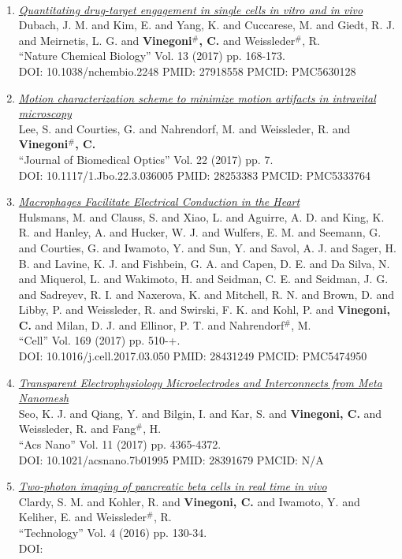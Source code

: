 \documentclass{resume}
\begin{document}
\begin{category}{~~}
\begin{enumerate}
\item \href{https://cvinegoni.github.io/assets/pdf/papers/2017-NCBIOL.pdf}{\it  Quantitating drug-target engagement in single cells in vitro and in vivo} \\ Dubach, J. M. and Kim, E. and Yang, K. and Cuccarese, M. and Giedt, R. J. and Meirnetis, L. G. and {\bf Vinegoni$^\#$, C.} and Weissleder$^\#$, R. \\ ``Nature Chemical Biology'' Vol. 13 (2017) pp. 168-173. \\ DOI: 10.1038/nchembio.2248 PMID: 27918558 PMCID: PMC5630128




\item \href{https://cvinegoni.github.io/assets/pdf/papers/2017-JBO.pdf}{\it  Motion characterization scheme to minimize motion artifacts in intravital microscopy} \\ Lee, S. and Courties, G. and Nahrendorf, M. and Weissleder, R. and {\bf Vinegoni$^\#$, C.} \\ ``Journal of Biomedical Optics'' Vol. 22 (2017) pp. 7. \\ DOI: 10.1117/1.Jbo.22.3.036005 PMID: 28253383 PMCID: PMC5333764\item \href{https://cvinegoni.github.io/assets/pdf/papers/2017-CELL.pdf}{\it  Macrophages Facilitate Electrical Conduction in the Heart} \\ Hulsmans, M. and Clauss, S. and Xiao, L. and Aguirre, A. D. and King, K. R. and Hanley, A. and Hucker, W. J. and Wulfers, E. M. and Seemann, G. and Courties, G. and Iwamoto, Y. and Sun, Y. and Savol, A. J. and Sager, H. B. and Lavine, K. J. and Fishbein, G. A. and Capen, D. E. and Da Silva, N. and Miquerol, L. and Wakimoto, H. and Seidman, C. E. and Seidman, J. G. and Sadreyev, R. I. and Naxerova, K. and Mitchell, R. N. and Brown, D. and Libby, P. and Weissleder, R. and Swirski, F. K. and Kohl, P. and {\bf Vinegoni, C.} and Milan, D. J. and Ellinor, P. T. and Nahrendorf$^\#$, M. \\ ``Cell'' Vol. 169 (2017) pp. 510-+. \\ DOI: 10.1016/j.cell.2017.03.050 PMID: 28431249 PMCID: PMC5474950\item \href{https://cvinegoni.github.io/assets/pdf/papers/2017-ACSN.pdf}{\it  Transparent Electrophysiology Microelectrodes and Interconnects from Meta Nanomesh} \\ Seo, K. J. and Qiang, Y. and Bilgin, I. and Kar, S. and {\bf Vinegoni, C.} and Weissleder, R. and Fang$^\#$, H. \\ ``Acs Nano'' Vol. 11 (2017) pp. 4365-4372. \\ DOI: 10.1021/acsnano.7b01995 PMID: 28391679 PMCID: N/A\item \href{https://cvinegoni.github.io/assets/pdf/papers/2016-TECHNOL.pdf}{\it  Two-photon imaging of pancreatic beta cells in real time in vivo} \\ Clardy, S. M. and Kohler, R. and {\bf Vinegoni, C.} and Iwamoto, Y. and Keliher, E. and Weissleder$^\#$, R. \\ ``Technology'' Vol. 4 (2016) pp. 130-34. \\ DOI: 
\end{enumerate}
\end{category}
\end{document}
